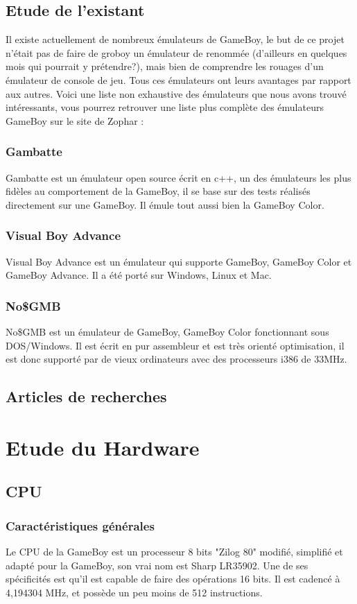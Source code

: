 \documentclass{report}
\begin{document}
\section{Etude de l'existant}
Il existe actuellement de nombreux émulateurs de GameBoy, le but de ce projet n'était pas de faire de groboy un émulateur de renommée (d'ailleurs en quelques mois qui pourrait y prétendre?), mais bien de comprendre les rouages d'un émulateur de console de jeu.
Tous ces émulateurs ont leurs avantages par rapport aux autres. Voici une liste non exhaustive des émulateurs que nous avons trouvé intéressants, vous pourrez retrouver une liste plus complète des émulateurs GameBoy sur le site de Zophar \cite{zophar}:

\subsection{Gambatte}
Gambatte \cite{gambatte} est un émulateur open source écrit en c++, un des émulateurs les plus fidèles au comportement de la GameBoy, il se base sur des tests réalisés directement sur une GameBoy. Il émule tout aussi bien la GameBoy Color.
\subsection{Visual Boy Advance}
Visual Boy Advance \cite{visualboyadv} est un émulateur qui supporte GameBoy, GameBoy Color et GameBoy Advance. Il a été porté sur Windows, Linux et Mac.
\subsection{No\$GMB}
No\$GMB \cite{nogmb} est un émulateur de GameBoy, GameBoy Color fonctionnant sous DOS/Windows. Il est écrit en pur assembleur et est très orienté optimisation, il est donc supporté par de vieux ordinateurs avec des processeurs i386 de 33MHz.
\section{Articles de recherches}

\chapter{Etude du Hardware}
\section{CPU}
\subsection{Caractéristiques générales}
Le CPU de la GameBoy est un processeur 8 bits "Zilog 80" modifié, simplifié et adapté pour la GameBoy, son vrai nom est Sharp LR35902.
Une de ses spécificités est qu'il est capable de faire des opérations 16 bits.
Il est cadencé à 4,194304 MHz, et possède un peu moins de 512 instructions.
\end{document}
